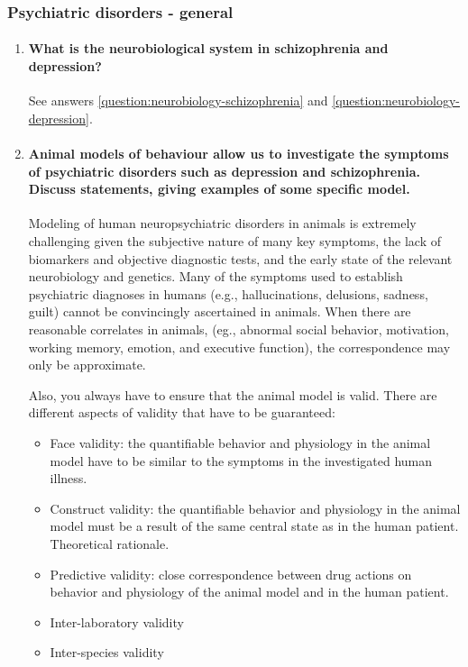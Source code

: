 \documentclass[12pt,article,oneside,a4paper]{memoir}
\begin{document}
\subsubsection{Psychiatric disorders - general}
\begin{enumerate}
\item \paragraph{What is the neurobiological system in schizophrenia and depression?}
See answers \ref{question:neurobiology-schizophrenia} and
\ref{question:neurobiology-depression}.

\item \paragraph{Animal models of behaviour allow us to investigate the
symptoms of psychiatric disorders such as depression and schizophrenia. Discuss
statements, giving examples of some specific model.}

Modeling of human neuropsychiatric disorders in animals is extremely
challenging given the subjective nature of many key symptoms, the lack of
biomarkers and objective diagnostic tests, and the early state of the relevant
neurobiology and genetics. Many of the symptoms used to establish psychiatric
diagnoses in humans (e.g., hallucinations, delusions, sadness, guilt) cannot be
convincingly ascertained in animals. When there are reasonable correlates in
animals, (eg., abnormal social behavior, motivation, working memory, emotion,
and executive function), the correspondence may only be approximate.

Also, you always have to ensure that the animal model is valid. There are
different aspects of validity that have to be guaranteed:
\begin{itemize}
\item Face validity: the quantifiable behavior and physiology in the animal
model have to be similar to the symptoms in the investigated human illness.
\item Construct validity: the quantifiable behavior and physiology in the
animal model must be a result of the same central state as in the human
patient. Theoretical rationale.
\item Predictive validity: close correspondence between drug actions on
behavior and physiology of the animal model and in the human patient.
\item Inter-laboratory validity
\item Inter-species validity
\end{itemize}


\end{enumerate}
\end{document}
